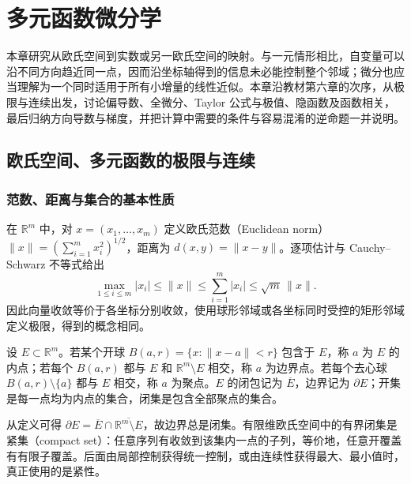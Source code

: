 \setcounter{chapter}{5} %
\chapter{多元函数微分学}
\label{chap:pei-multivariable-differentiation}

本章研究从欧氏空间到实数或另一欧氏空间的映射。与一元情形相比，自变量可以沿不同方向趋近同一点，因而沿坐标轴得到的信息未必能控制整个邻域；微分也应当理解为一个同时适用于所有小增量的线性近似。本章沿教材第六章的次序，从极限与连续出发，讨论偏导数、全微分、Taylor 公式与极值、隐函数及函数相关，最后归纳方向导数与梯度，并把计算中需要的条件与容易混淆的逆命题一并说明。

\section{欧氏空间、多元函数的极限与连续}
\label{sec:pei-euclidean-limits-continuity}

\subsection{范数、距离与集合的基本性质}

在 $\mathbb R^m$ 中，对 $x=(x_1,\ldots,x_m)$ 定义欧氏范数（Euclidean norm）$\|x\|=(\sum_{i=1}^m x_i^2)^{1/2}$，距离为 $d(x,y)=\|x-y\|$。逐项估计与 Cauchy--Schwarz 不等式给出
\begin{equation}
\label{eq:pei-coordinate-norm-bounds}
\max_{1\le i\le m}|x_i|\le\|x\|\le\sum_{i=1}^m|x_i|\le\sqrt m\,\|x\|.
\end{equation}
因此向量收敛等价于各坐标分别收敛，使用球形邻域或各坐标同时受控的矩形邻域定义极限，得到的概念相同。

\begin{definition}
设 $E\subset\mathbb R^m$。若某个开球 $B(a,r)=\{x:\|x-a\|<r\}$ 包含于 $E$，称 $a$ 为 $E$ 的内点；若每个 $B(a,r)$ 都与 $E$ 和 $\mathbb R^m\setminus E$ 相交，称 $a$ 为边界点。若每个去心球 $B(a,r)\setminus\{a\}$ 都与 $E$ 相交，称 $a$ 为聚点。$E$ 的闭包记为 $\overline E$，边界记为 $\partial E$；开集是每一点均为内点的集合，闭集是包含全部聚点的集合。
\end{definition}

从定义可得 $\partial E=\overline E\cap\overline{\mathbb R^m\setminus E}$，故边界总是闭集。有限维欧氏空间中的有界闭集是紧集（compact set）：任意序列有收敛到该集内一点的子列，等价地，任意开覆盖有有限子覆盖。后面由局部控制获得统一控制，或由连续性获得最大、最小值时，真正使用的是紧性。

